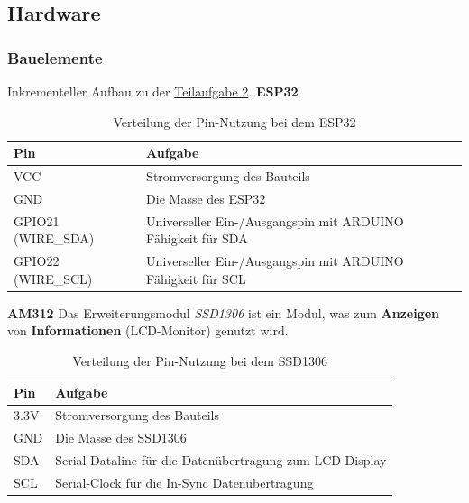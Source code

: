 \documentclass[18pt]{article}
\begin{document}
\subsection{Hardware}
\subsubsection{Bauelemente}
Inkrementeller Aufbau zu der \hyperref[tab:teil_2_steckbrett_esp32]{Teilaufgabe 2}.
\newline
\newline
\textbf{ESP32}
\renewcommand{\arraystretch}{1.5}
\begin{table}[h!]
	\centering
	\caption{Verteilung der Pin-Nutzung bei dem ESP32}
	\label{tab:teil_3_steckbrett_esp32}
	\begin{tabular}{|l|l|} 
		\hline
		Pin & Aufgabe \\
		\hline
		VCC & Stromversorgung des Bauteils \\
		GND & Die Masse des ESP32 \\
		GPIO21 (WIRE\_SDA) & Universeller Ein-/Ausgangspin mit ARDUINO Fähigkeit für SDA \\
		GPIO22 (WIRE\_SCL) & Universeller Ein-/Ausgangspin mit ARDUINO Fähigkeit für SCL \\
		\hline
	\end{tabular}
\end{table}
\renewcommand{\arraystretch}{1}
\newline
\newline
\textbf{AM312}
\newline
Das Erweiterungsmodul \textit{SSD1306} ist ein Modul, was zum \textbf{Anzeigen} von \textbf{Informationen} (LCD-Monitor) genutzt wird.
\renewcommand{\arraystretch}{1.5}
\begin{table}[h!]
	\centering
	\caption{Verteilung der Pin-Nutzung bei dem SSD1306}
	\label{tab:teil_3_steckbrett_ssd1306}
	\begin{tabular}{|l|l|}
		\hline
		Pin & Aufgabe \\
		\hline
		3.3V & Stromversorgung des Bauteils \\
		GND & Die Masse des SSD1306 \\
		SDA & Serial-Dataline für die Datenübertragung zum LCD-Display \\
		SCL & Serial-Clock für die In-Sync Datenübertragung \\
		\hline
	\end{tabular}
\end{table}
\renewcommand{\arraystretch}{1}
\end{document}
